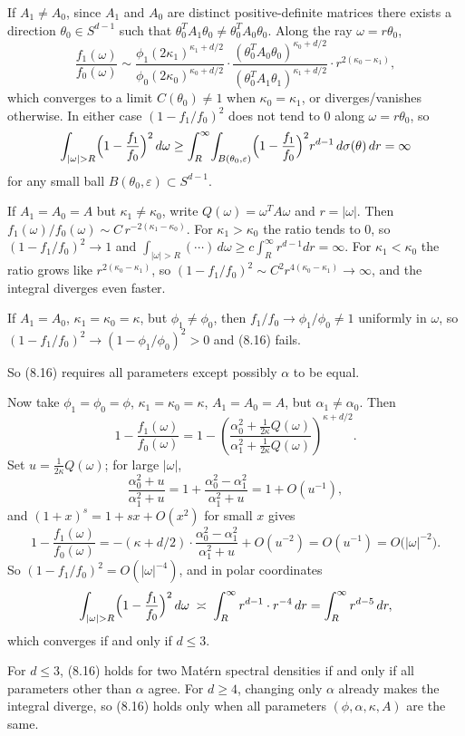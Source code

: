 \documentclass[answers,12pt,addpoints]{exam}
\begin{document}
\begin{questions}
\begin{solution}
If $A_1\ne A_0$, since $A_1$ and $A_0$ are distinct positive-definite
matrices there exists a direction $\theta_0\in S^{d-1}$ such that
$\theta_0^T A_1\theta_0\ne\theta_0^T A_0\theta_0$.
Along the ray $\omega=r\theta_0$,
\[
\frac{f_1(\omega)}{f_0(\omega)}
\sim
\frac{\phi_1(2\kappa_1)^{\kappa_1+d/2}}{\phi_0(2\kappa_0)^{\kappa_0+d/2}}
\cdot
\frac{(\theta_0^T A_0\theta_0)^{\kappa_0+d/2}}
     {(\theta_0^T A_1\theta_1)^{\kappa_1+d/2}}
\cdot r^{2(\kappa_0-\kappa_1)},
\]
which converges to a limit $C(\theta_0)\ne1$ when $\kappa_0=\kappa_1$,
or diverges/vanishes otherwise.  In either case $(1-f_1/f_0)^2$
does not tend to $0$ along $\omega=r\theta_0$, so
\[
\int_{|\omega|>R}\Bigl(1-\frac{f_1}{f_0}\Bigr)^2\,d\omega
\ge \int_R^\infty\!\int_{B(\theta_0,\varepsilon)}\Bigl(1-\frac{f_1}{f_0}\Bigr)^2
r^{d-1}\,d\sigma(\theta)\,dr = \infty
\]
for any small ball $B(\theta_0,\varepsilon)\subset S^{d-1}$.

If $A_1=A_0=A$ but $\kappa_1\ne\kappa_0$, write $Q(\omega)=\omega^TA\omega$
and $r=|\omega|$.  Then $f_1(\omega)/f_0(\omega)\sim C\,r^{-2(\kappa_1-\kappa_0)}$.
For $\kappa_1>\kappa_0$ the ratio tends to $0$, so $(1-f_1/f_0)^2\to1$
and $\int_{|\omega|>R}(\cdots)\,d\omega\ge c\int_R^\infty r^{d-1}dr=\infty$.
For $\kappa_1<\kappa_0$ the ratio grows like $r^{2(\kappa_0-\kappa_1)}$,
so $(1-f_1/f_0)^2\sim C^2 r^{4(\kappa_0-\kappa_1)}\to\infty$, and the
integral diverges even faster.

If $A_1=A_0$, $\kappa_1=\kappa_0=\kappa$, but $\phi_1\ne\phi_0$, then
$f_1/f_0\to\phi_1/\phi_0\ne1$ uniformly in $\omega$, so
$(1-f_1/f_0)^2\to(1-\phi_1/\phi_0)^2>0$ and (8.16) fails.

So (8.16) requires all parameters except possibly $\alpha$ to be equal.

Now take $\phi_1=\phi_0=\phi$, $\kappa_1=\kappa_0=\kappa$,
$A_1=A_0=A$, but $\alpha_1\ne\alpha_0$.  Then
\[
1-\frac{f_1(\omega)}{f_0(\omega)}
=1-\left(\frac{\alpha_0^2+\tfrac{1}{2\kappa}Q(\omega)}
              {\alpha_1^2+\tfrac{1}{2\kappa}Q(\omega)}\right)^{\kappa+d/2}.
\]
Set $u=\tfrac{1}{2\kappa}Q(\omega)$; for large $|\omega|$,
\[
\frac{\alpha_0^2+u}{\alpha_1^2+u}
=1+\frac{\alpha_0^2-\alpha_1^2}{\alpha_1^2+u}
=1+O(u^{-1}),
\]
and $(1+x)^s=1+sx+O(x^2)$ for small $x$ gives
\[
1-\frac{f_1(\omega)}{f_0(\omega)}
= -(\kappa+d/2)\cdot\frac{\alpha_0^2-\alpha_1^2}{\alpha_1^2+u}+O(u^{-2})
= O(u^{-1})=O\!\bigl(|\omega|^{-2}\bigr).
\]
So $(1-f_1/f_0)^2=O(|\omega|^{-4})$, and in polar coordinates
\[
\int_{|\omega|>R}\Bigl(1-\frac{f_1}{f_0}\Bigr)^2\,d\omega
\;\asymp\;\int_R^\infty r^{d-1}\cdot r^{-4}\,dr
=\int_R^\infty r^{d-5}\,dr,
\]
which converges if and only if $d\le3$.

For $d\le3$, (8.16) holds for two Matérn spectral densities if and only
if all parameters other than $\alpha$ agree.  For $d\ge4$, changing only
$\alpha$ already makes the integral diverge, so (8.16) holds only when
all parameters $(\phi,\alpha,\kappa,A)$ are the same.
\end{solution}

\end{questions}
\end{document}
